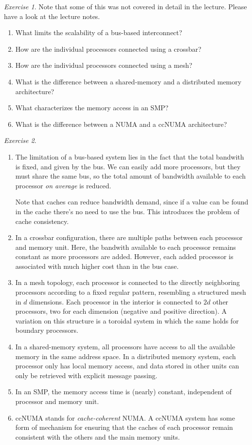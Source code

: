 \documentclass[onecolumn, oneside, a4paper, 11pt]{memoir}
\theoremstyle{remark}
\newtheorem{ex}{Exercise}
\begin{document}
\begin{ex}
  Note that some of this was not covered in detail in the lecture. Please have a
  look at the lecture notes.
  \begin{enumerate}
  \item What limits the scalability of a bus-based interconnect?
  \item How are the individual processors connected using a crossbar?
  \item How are the individual processors connected using a mesh?
  \item What is the difference between a shared-memory and a distributed
    memory architecture?
  \item What characterizes the memory access in an SMP?
  \item What is the difference between a NUMA and a ccNUMA architecture?
  \end{enumerate}
\end{ex}
\begin{ex} ~
  \begin{enumerate}
  \item The limitation of a bus-based system lies in the fact that the total
    bandwith is fixed, and given by the bus. We can easily add more processors,
    but they must share the same bus, so the total amount of bandwidth available
    to each processor \emph{on average} is reduced.

    Note that caches can reduce bandwidth demand, since if a value can be found
    in the cache there's no need to use the bus. This introduces the problem of
    cache consistency.
  \item In a crossbar configuration, there are multiple paths between each
    processor and memory unit. Here, the bandwith available to each processor
    remains constant as more processors are added. However, each added processor
    is associated with much higher cost than in the bus case.
  \item In a mesh topology, each processor is connected to the directly
    neighboring processors according to a fixed regular pattern, resembling a
    structured mesh in $d$ dimensions. Each processor in the interior is
    connected to $2d$ other processors, two for each dimension (negative and
    positive direction). A variation on this structure is a toroidal system in
    which the same holds for boundary processors.
  \item In a shared-memory system, all processors have access to all the
    available memory in the same address space. In a distributed memory system,
    each processor only has local memory access, and data stored in other units
    can only be retrieved with explicit message passing.
  \item In an SMP, the memory access time is (nearly) constant, independent of
    processor and memory unit.
  \item ccNUMA stands for \emph{cache-coherent} NUMA. A ccNUMA system has some
    form of mechanism for ensuring that the caches of each processor remain
    consistent with the others and the main memory units.
  \end{enumerate}
\end{ex}
\end{document}
